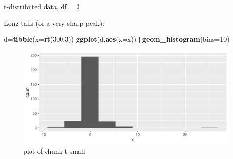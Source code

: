 \documentclass[
  ignorenonframetext,
]{beamer}
\newenvironment{Shaded}{\begin{snugshade}}{\end{snugshade}}
\newcommand{\DataTypeTok}[1]{\textcolor[rgb]{0.13,0.29,0.53}{#1}}
\newcommand{\DecValTok}[1]{\textcolor[rgb]{0.00,0.00,0.81}{#1}}
\newcommand{\KeywordTok}[1]{\textcolor[rgb]{0.13,0.29,0.53}{\textbf{#1}}}
\newcommand{\NormalTok}[1]{#1}
\newcommand{\OperatorTok}[1]{\textcolor[rgb]{0.81,0.36,0.00}{\textbf{#1}}}
\begin{document}
\begin{frame}[fragile]{t-distributed data, df = 3}
\protect\hypertarget{t-distributed-data-df-3}{}

Long tails (or a very sharp peak):

\begin{Shaded}
\begin{Highlighting}[]
\NormalTok{d=}\KeywordTok{tibble}\NormalTok{(}\DataTypeTok{x=}\KeywordTok{rt}\NormalTok{(}\DecValTok{300}\NormalTok{,}\DecValTok{3}\NormalTok{))}
\KeywordTok{ggplot}\NormalTok{(d,}\KeywordTok{aes}\NormalTok{(}\DataTypeTok{x=}\NormalTok{x))}\OperatorTok{+}\KeywordTok{geom_histogram}\NormalTok{(}\DataTypeTok{bins=}\DecValTok{10}\NormalTok{)}
\end{Highlighting}
\end{Shaded}

\begin{figure}
\centering
\includegraphics{figure/t-small-1.pdf}
\caption{plot of chunk t-small}
\end{figure}

\end{frame}
\end{document}
